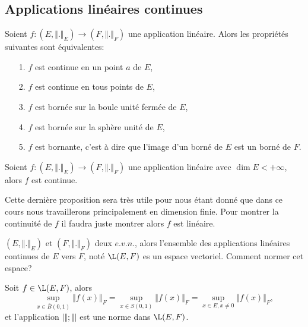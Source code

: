 \documentclass[class=report,crop=false]{standalone}
\begin{document}
\subsection{Applications linéaires continues}
 \begin{proposition}
\textcolor[rgb]{0.50,0.00,0.25}{
Soient $f:  (E, \Vert . \Vert_E) \rightarrow (F, \Vert . \Vert_F)$  une application linéaire. Alors les propriétés suivantes 
sont équivalentes:
\begin{itemize}
\item[1.] $f$ est continue en un point $a$ de $E$,
\item[2.] $f$ est continue en tous points de $E$,
\item[3.] $f$ est bornée sur la boule unité fermée de $E$,
\item[4.] $f$ est bornée sur la sphère unité de $E$,
\item[5.] $f$ est bornante, c'est à dire que l'image d'un borné de $E$ est un borné de $F$.
\end{itemize}
}
\end{proposition}

 \begin{proposition}
\textcolor[rgb]{0.50,0.00,0.25}{
Soient $f:  (E, \Vert . \Vert_E) \rightarrow (F, \Vert . \Vert_F)$  une application linéaire avec $ \dim E < +\infty$, alors $f$ est continue.
}
\end{proposition}

\begin{remarque*}
\textcolor[rgb]{0.00,0.00,1.00}{
Cette dernière proposition sera très utile pour nous étant donné que dans ce cours nous travaillerons principalement
en dimension finie. Pour montrer la continuité de $f$ il faudra juste montrer alors $f$ est linéaire. 
}
\end{remarque*}


 \noindent $(E, \Vert . \Vert_E)$ et $(F, \Vert . \Vert_F)$ deux $e.v.n.$, alors l'ensemble des applications linéaires continues de $E$ vers $F$, noté $\L (E,F)$ es un espace vectoriel. Comment normer  cet espace?
 
 
 
 \begin{proposition}
\textcolor[rgb]{0.50,0.00,0.25}{
Soit $f \in \L(E,F)$, alors 
\begin{equation*}
\displaystyle \sup_{x \in \overline{B}(0,1)} \Vert f(x) \Vert_F= \displaystyle \sup_{x \in S(0,1)} \Vert f(x) \Vert_F = \displaystyle \sup_{x \in E, x \neq 0} \Vert f(x) \Vert_F,
\end{equation*}
et l'application $\vert \Vert ; \Vert \vert$ est une norme dans  $\L(E,F)$.
}
\end{proposition}
 
\end{document}

